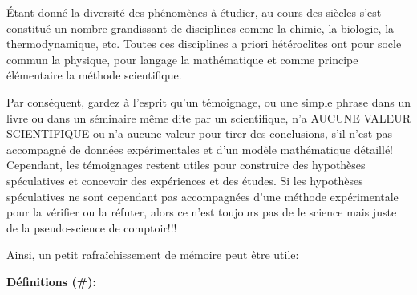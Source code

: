 	Étant donné la diversité des phénomènes à étudier, au cours des siècles s'est constitué un nombre grandissant de disciplines comme la chimie, la biologie, la thermodynamique, etc. Toutes ces disciplines a priori hétéroclites ont pour socle commun la physique, pour langage la mathématique et comme principe élémentaire la méthode scientifique.
	\begin{tcolorbox}[title=Remark,colframe=black,arc=10pt]
	Par conséquent, gardez à l'esprit qu'un témoignage, ou une simple phrase dans un livre ou dans un séminaire même dite par un scientifique, n'a AUCUNE VALEUR SCIENTIFIQUE ou n'a aucune valeur pour tirer des conclusions, s'il n'est pas accompagné de données expérimentales et d'un modèle mathématique détaillé! Cependant, les témoignages restent utiles pour construire des hypothèses spéculatives et concevoir des expériences et des études. Si les hypothèses spéculatives ne sont cependant pas accompagnées d'une méthode expérimentale pour la vérifier ou la réfuter, alors ce n'est toujours pas de le science mais juste de la pseudo-science de comptoir!!!
	\end{tcolorbox}
	Ainsi, un petit rafraîchissement de mémoire peut être utile:

\textbf{Définitions (\#\mydef):}

